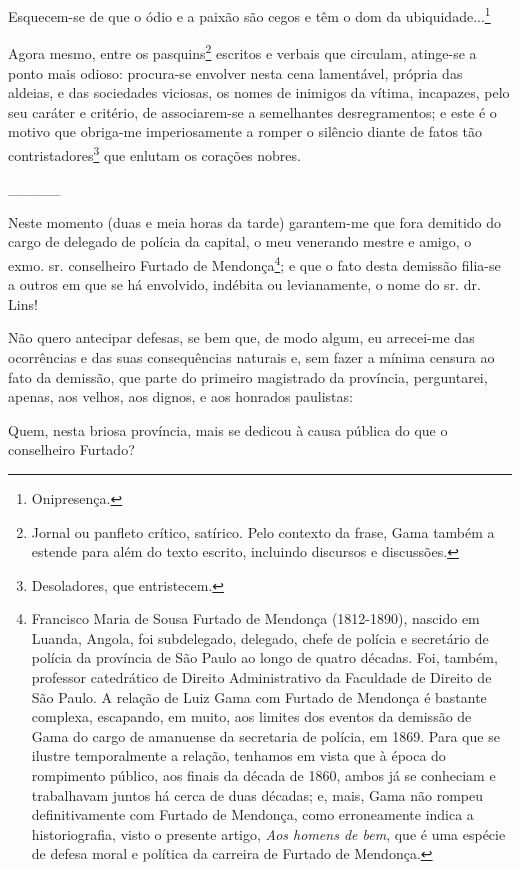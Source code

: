 Esquecem-se de que o ódio e a paixão são cegos e têm o dom da
ubiquidade...\footnote{Onipresença.}

Agora mesmo, entre os pasquins\footnote{Jornal ou panfleto crítico,
  satírico. Pelo contexto da frase, Gama também a estende para além do
  texto escrito, incluindo discursos e discussões.} escritos e verbais
que circulam, atinge-se a ponto mais odioso: procura-se envolver nesta
cena lamentável, própria das aldeias, e das sociedades viciosas, os
nomes de inimigos da vítima, incapazes, pelo seu caráter e critério, de
associarem-se a semelhantes desregramentos; e este é o motivo que
obriga-me imperiosamente a romper o silêncio diante de fatos tão
contristadores\footnote{Desoladores, que entristecem.} que enlutam os
corações nobres.

\_\_\_\_\_

Neste momento (duas e meia horas da tarde) garantem-me que fora demitido
do cargo de delegado de polícia da capital, o meu venerando mestre e
amigo, o exmo. sr. conselheiro Furtado de Mendonça\footnote{Francisco
  Maria de Sousa Furtado de Mendonça (1812-1890), nascido em Luanda,
  Angola, foi subdelegado, delegado, chefe de polícia e secretário de
  polícia da província de São Paulo ao longo de quatro décadas. Foi,
  também, professor catedrático de Direito Administrativo da Faculdade
  de Direito de São Paulo. A relação de Luiz Gama com Furtado de
  Mendonça é bastante complexa, escapando, em muito, aos limites dos
  eventos da demissão de Gama do cargo de amanuense da secretaria de
  polícia, em 1869. Para que se ilustre temporalmente a relação,
  tenhamos em vista que à época do rompimento público, aos finais da
  década de 1860, ambos já se conheciam e trabalhavam juntos há cerca de
  duas décadas; e, mais, Gama não rompeu definitivamente com Furtado de
  Mendonça, como erroneamente indica a historiografia, visto o presente
  artigo, \emph{Aos homens de bem}, que é uma espécie de defesa moral e
  política da carreira de Furtado de Mendonça.}; e que o fato desta
demissão filia-se a outros em que se há envolvido, indébita ou
levianamente, o nome do sr. dr. Lins!

Não quero antecipar defesas, se bem que, de modo algum, eu arrecei-me
das ocorrências e das suas consequências naturais e, sem fazer a mínima
censura ao fato da demissão, que parte do primeiro magistrado da
província, perguntarei, apenas, aos velhos, aos dignos, e aos honrados
paulistas:

Quem, nesta briosa província, mais se dedicou à causa pública do que o
conselheiro Furtado?

